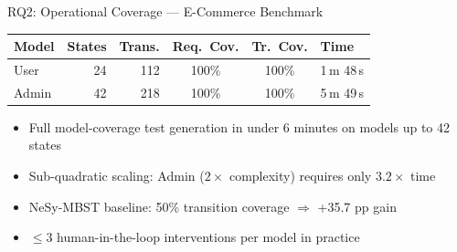 \documentclass[aspectratio=169,10pt]{beamer}
\newcommand{\pos}[1]{\textcolor{positive}{#1}}
\newcommand{\HL}[1]{\textcolor{emphasis}{#1}}
\begin{document}
\begin{frame}{RQ2: Operational Coverage — E-Commerce Benchmark}
  \vspace{0.2em}
  \begin{center}
  \small
  \begin{tabular}{l r r c c l}
    \toprule
    \textbf{Model} & \textbf{States} & \textbf{Trans.} & \textbf{Req.\ Cov.} & \textbf{Tr.\ Cov.} & \textbf{Time} \\
    \midrule
    User  & 24 & 112 & \pos{100\%} & \pos{100\%} & 1\,m 48\,s \\
    Admin & 42 & 218 & \pos{100\%} & \pos{100\%} & 5\,m 49\,s \\
    \bottomrule
  \end{tabular}
  \end{center}
  \vspace{0.4em}
  \begin{itemize}
    \item Full model-coverage test generation in \HL{under 6 minutes} on models up to 42 states
    \item \pos{Sub-quadratic scaling}: Admin ($2\times$ complexity) requires only $3.2\times$ time
    \item NeSy-MBST baseline: 50\% transition coverage $\Rightarrow$ \pos{+35.7 pp gain}
    \item $\leq 3$ human-in-the-loop interventions per model in practice
  \end{itemize}
\end{frame}
\end{document}
